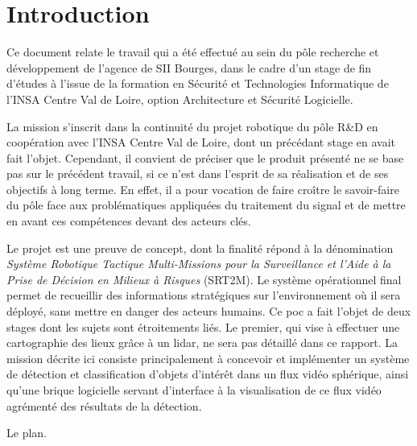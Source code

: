 \section*{Introduction}
{}
	
	Ce document relate le travail qui a été effectué au sein du pôle recherche et développement de l'agence de SII Bourges, dans le cadre d'un stage de fin d'études à l'issue de la formation en Sécurité et Technologies Informatique de l'INSA Centre Val de Loire, option Architecture et Sécurité Logicielle.
	
	La mission s'inscrit dans la continuité du projet robotique du pôle R\&D en coopération avec l'INSA Centre Val de Loire, dont un précédant stage en avait fait l'objet. Cependant, il convient de préciser que le produit présenté ne se base pas sur le précédent travail, si ce n'est dans l'esprit de sa réalisation et de ses objectifs à long terme. En effet, il a pour vocation de faire croître le savoir-faire du pôle face aux problématiques appliquées du traitement du signal et de mettre en avant ces compétences devant des acteurs clés.
	
	Le projet est une preuve de concept, dont la finalité répond à la dénomination \emph{Système Robotique Tactique Multi-Missions pour la Surveillance et l'Aide à la Prise de Décision en Milieux à Risques} (SRT2M). Le système opérationnel final permet de recueillir des informations stratégiques sur l'environnement où il sera déployé, sans mettre en danger des acteurs humains. Ce \gls{poc} a fait l'objet de deux stages dont les sujets sont étroitements liés. Le premier, qui vise à effectuer une cartographie des lieux grâce à un \gls{lidar}, ne sera pas détaillé dans ce rapport. La mission décrite ici consiste principalement à concevoir et implémenter un système de détection et classification d'objets d'intérêt dans un flux vidéo sphérique, ainsi qu'une brique logicielle servant d'interface à la visualisation de ce flux vidéo agrémenté des résultats de la détection.
	
	Le plan.
